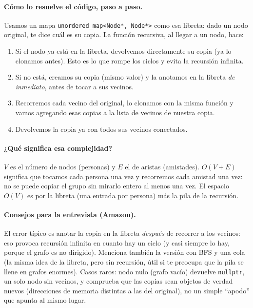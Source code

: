 \paragraph{Cómo lo resuelve el código, paso a paso.} Usamos un mapa
\texttt{unordered\_map<Node*, Node*>} como esa libreta: dado un nodo
original, te dice cuál es su copia. La función recursiva, al llegar a un
nodo, hace:
\begin{enumerate}
  \item Si el nodo ya está en la libreta, devolvemos directamente su copia
        (ya lo clonamos antes). Esto es lo que rompe los ciclos y evita la
        recursión infinita.
  \item Si no está, creamos su copia (mismo valor) y la anotamos en la
        libreta \emph{de inmediato}, antes de tocar a sus vecinos.
  \item Recorremos cada vecino del original, lo clonamos con la misma
        función y vamos agregando esas copias a la lista de vecinos de
        nuestra copia.
  \item Devolvemos la copia ya con todos sus vecinos conectados.
\end{enumerate}




\paragraph{¿Qué significa esa complejidad?} $V$ es el número de nodos
(personas) y $E$ el de aristas (amistades). $O(V+E)$ significa que tocamos
cada persona una vez y recorremos cada amistad una vez: no se puede copiar el
grupo sin mirarlo entero al menos una vez. El espacio $O(V)$ es por la
libreta (una entrada por persona) más la pila de la recursión.

\paragraph{Consejos para la entrevista (Amazon).} El error típico es anotar
la copia en la libreta \emph{después} de recorrer a los vecinos: eso provoca
recursión infinita en cuanto hay un ciclo (y casi siempre lo hay, porque el
grafo es no dirigido). Menciona también la versión con BFS y una cola (la
misma idea de la libreta, pero sin recursión, útil si te preocupa que la pila
se llene en grafos enormes). Casos raros: nodo nulo (grafo vacío) devuelve
\texttt{nullptr}, un solo nodo sin vecinos, y comprueba que las copias sean
objetos de verdad nuevos (direcciones de memoria distintas a las del
original), no un simple ``apodo'' que apunta al mismo lugar.
